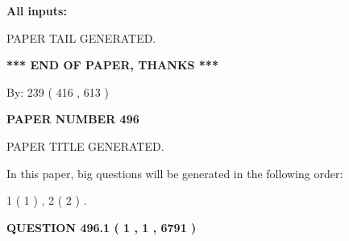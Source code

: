 \documentclass[12pt]{article}
\begin{document}
   
   
   
\noindent{}
   
   
   
   
\noindent\vspace{0.1in}\hspace{-0.08in} {\textbf{\Large{All inputs: }}}
   
   
   
   
   
   
 \vspace{0.2in}
 
   
   
\vspace{2.0in} PAPER TAIL GENERATED.
   
   
   
   
\vspace{1.0in} 
{\textbf{\large{ *** END OF PAPER, THANKS *** }}} 
   
   
\hspace{1.0in} By: 
 239 ( 416 ,  613 )
   
   
   
   
\newpage 
\setcounter{page}{ 
   496001 } 
   
   
   
   
 {\textbf{ \Large{ PAPER NUMBER  496  }}}
   
   
\vspace{0.2in}
   
   
   
   
   
   
   
   
 \vspace{0.2in}
 
 
 
 
   
   
 PAPER TITLE GENERATED.
   
   
   
\vspace{0.2in}
   
In this paper, big questions will be generated in the following order: 
   
   
   1 ( 1 )
 ,
   2 ( 2 )
 .
  
\vspace{0.2in}
  
{\textbf{\Large{QUESTION
496.1 
 ( 1 , 1 , 6791 )
}}}
  
\end{document}

